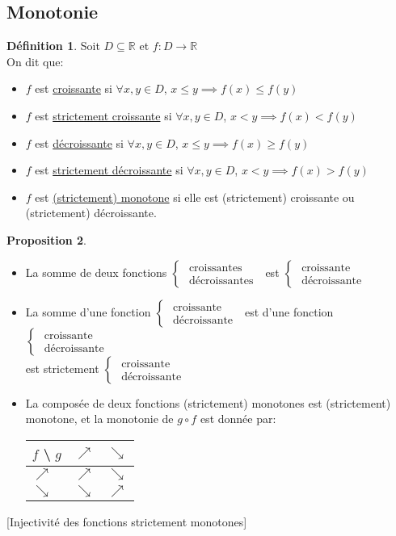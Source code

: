 \documentclass[10pt,a4paper]{article}
\theoremstyle{definition}
\newtheorem{proposition}{Proposition}[section]
\newtheorem{definition}[proposition]{Définition}
\begin{document}
\subsection{Monotonie}
\begin{definition}
Soit $D \subseteq \mathbb{R}$ et $f: D \to \mathbb{R}$ \\
On dit que:
\begin{itemize}
\item $f$ est \uline{croissante} si $\forall x, y \in D$, $x \leq y \implies f(x) \leq f(y)$
\item $f$ est \uline{strictement croissante} si $\forall x, y \in D$, $x < y \implies f(x) < f(y)$
\item $f$ est \uline{décroissante} si $\forall x, y \in D$, $x \leq y \implies f(x) \geq f(y)$
\item $f$ est \uline{strictement décroissante} si $\forall x, y \in D$, $x < y \implies f(x) > f(y)$
\item $f$ est \uline{(strictement) monotone} si elle est (strictement) croissante ou (strictement) décroissante.
\end{itemize}
\end{definition}
\begin{proposition}
\hfill
\begin{itemize}
\item La somme de deux fonctions $\begin{cases}
\text{ croissantes } \\
\text{ décroissantes }
\end{cases}$ est $\begin{cases}
\text{ croissante } \\
\text{ décroissante }
\end{cases}$
\item La somme d'une fonction $\begin{cases}
\text{ croissante } \\
\text{ décroissante }
\end{cases}$ est d'une fonction $\begin{cases}
\text{ croissante } \\
\text{ décroissante }
\end{cases}$ \\ 
est strictement $\begin{cases}
\text{ croissante } \\
\text{ décroissante }
\end{cases}$
\item La composée de deux fonctions (strictement) monotones est (strictement) monotone, et la monotonie de $g \circ f$ est donnée par:
\begin{center}
\begin{tabular}{M{3em} | M{3em} | M{3em}}
$f$ \textbackslash  $\,\,g$ & $\nearrow$ & $\searrow$ \\
\hline
$\nearrow$ & $\nearrow$ & $\searrow$ \\
\hline
$\searrow$ & $\searrow$ & $\nearrow$
\end{tabular}
\end{center}
\end{itemize}
\end{proposition}[Injectivité des fonctions strictement monotones]
\end{document}
